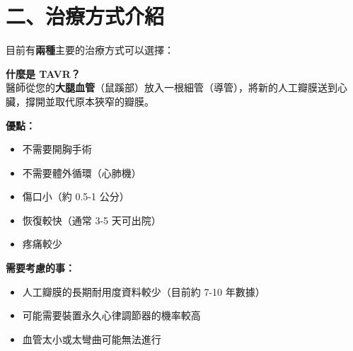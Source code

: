 \documentclass[12pt,a4paper]{article}
\begin{document}
\newpage

\section*{\textcolor{emergency_red}{\Large 二、治療方式介紹}}

\begin{center}
{\large 目前有\textbf{兩種}主要的治療方式可以選擇：}
\end{center}

\vspace{0.5cm}

\begin{tcolorbox}[
    colback=blue!5,
    colframe=emergency_blue,
    title={\Large\bfseries 選項 A：經導管主動脈瓣膜置換術 (TAVR)},
    fonttitle=\bfseries\color{white},
    coltitle=white,
    colbacktitle=emergency_blue,
    arc=10pt,
    boxrule=2pt
]

\textbf{\large 什麼是 TAVR？}\\[0.3cm]
醫師從您的\textbf{大腿血管}（鼠蹊部）放入一根細管（導管），將新的人工瓣膜送到心臟，撐開並取代原本狹窄的瓣膜。

\vspace{0.5cm}

\begin{minipage}[t]{0.48\textwidth}
\textbf{\textcolor{pda_green}{優點：}}
\begin{itemize}[leftmargin=*, itemsep=3pt]
    \item 不需要開胸手術
    \item 不需要體外循環（心肺機）
    \item 傷口小（約 0.5-1 公分）
    \item 恢復較快（通常 3-5 天可出院）
    \item 疼痛較少
\end{itemize}
\end{minipage}
\hfill
\begin{minipage}[t]{0.48\textwidth}
\textbf{\textcolor{emergency_red}{需要考慮的事：}}
\begin{itemize}[leftmargin=*, itemsep=3pt]
    \item 人工瓣膜的長期耐用度資料較少（目前約 7-10 年數據）
    \item 可能需要裝置永久心律調節器的機率較高
    \item 血管太小或太彎曲可能無法進行
\end{itemize}
\end{minipage}

\end{tcolorbox}
\end{document}
